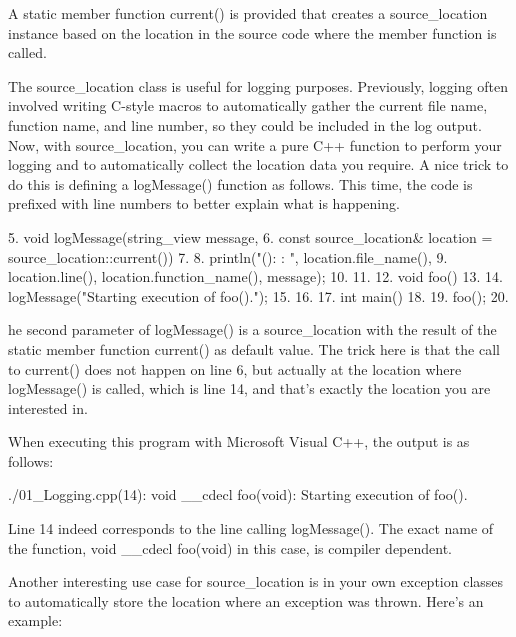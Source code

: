 A static member function current() is provided that creates a source\_location instance based on the location in the source code where the member function is called.


The source\_location class is useful for logging purposes. Previously, logging often involved writing C-style macros to automatically gather the current file name, function name, and line number, so they could be included in the log output. Now, with source\_location, you can write a pure C++ function to perform your logging and to automatically collect the location data you require. A nice trick to do this is defining a logMessage() function as follows. This time, the code is prefixed with line numbers to better explain what is happening.

\begin{shell}
5.  void logMessage(string_view message,
6.  const source_location& location = source_location::current())
7.  {
8.      println("{}({}): {}: {}", location.file_name(),
9.      location.line(), location.function_name(), message);
10. }
11.
12. void foo()
13. {
14.     logMessage("Starting execution of foo().");
15. }
16.
17. int main()
18. {
19.     foo();
20. }
\end{shell}

he second parameter of logMessage() is a source\_location with the result of the static member function current() as default value. The trick here is that the call to current() does not happen on line 6, but actually at the location where logMessage() is called, which is line 14, and that’s exactly the location you are interested in.

When executing this program with Microsoft Visual C++, the output is as follows:

\begin{shell}
./01_Logging.cpp(14): void __cdecl foo(void): Starting execution of foo().
\end{shell}

Line 14 indeed corresponds to the line calling logMessage(). The exact name of the function, void \_\_cdecl foo(void) in this case, is compiler dependent.


Another interesting use case for source\_location is in your own exception classes to automatically store the location where an exception was thrown. Here’s an example:

